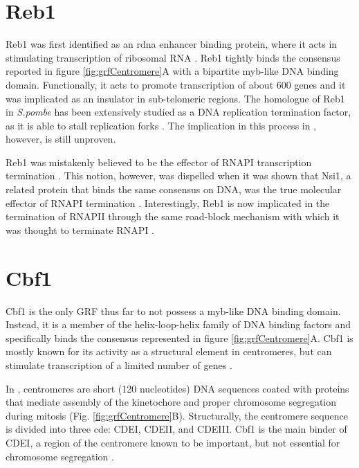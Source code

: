 \section{Reb1}

Reb1 was first identified as an \gls{rdna} enhancer binding protein, where it acts in stimulating transcription of ribosomal RNA \cite{planta:1995:global}. 
Reb1 tightly binds the consensus reported in figure \ref{fig:grfCentromere}A with a bipartite myb-like DNA binding domain.
Functionally, it acts to promote transcription of about 600 genes and it was implicated as an insulator in sub-telomeric regions. 
The homologue of Reb1 in \textit{S.pombe} has been extensively studied as a DNA replication termination factor, as it is able to stall replication forks \cite{sa:2004:transcription}. The implication in this process in \cer{}, however, is still unproven.


Reb1 was mistakenly believed to be the effector of RNAPI transcription termination \cite{lang:1995:transcription}. 
This notion, however, was dispelled when it was shown that Nsi1, a related protein that binds the same consensus on DNA, was the true molecular effector of RNAPI termination \cite{reiter:2012:reb1homologue}. 
Interestingly, Reb1 is now implicated in the termination of RNAPII through the same road-block mechanism with which it was thought to terminate RNAPI \cite{colin:2014:roadblock}.


\section{Cbf1}

Cbf1 is the only GRF thus far to not possess a myb-like DNA binding domain. Instead, it is a member of the helix-loop-helix family of DNA binding factors and specifically binds the consensus represented in figure \ref{fig:grfCentromere}A. 
Cbf1 is mostly known for its activity as a structural element in centromeres, but can stimulate transcription of a limited number of genes \cite{mellor:1990:cpf1}.


In \cer{}, centromeres are short (120 nucleotides) DNA sequences coated with proteins that mediate assembly of the kinetochore and proper chromosome segregation during mitosis (Fig. \ref{fig:grfCentromere}B). 
Structurally, the centromere sequence is divided into three \gls{cde}: CDEI, CDEII, and CDEIII. Cbf1 is the main binder of CDEI, a region of the centromere known to be important, but not essential for chromosome segregation \cite{niedenthal:1993:cpf1}. 

